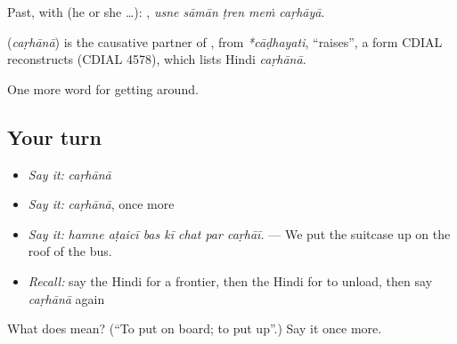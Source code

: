 Past, with  (he or she …):     , \emph{usne sāmān ṭren meṁ caṛhāyā}.

\begin{cousinweb}
\textbf{} (\emph{caṛhānā}) is the causative partner of , from \emph{*cāḍhayati}, \textquotedblleft{}raises\textquotedblright{}, a form CDIAL reconstructs (CDIAL 4578), which lists Hindi \emph{caṛhānā}.
\end{cousinweb}

\begin{grammarlens}[title={What you've built}]
One more word for getting around.
\end{grammarlens}

\subsection*{Your turn}
\begin{itemize}
\raggedright
  \item \emph{Say it:} \emph{caṛhānā}
  \item \emph{Say it:} \emph{caṛhānā}, once more
  \item \emph{Say it:} \emph{hamne aṭaicī bas kī chat par caṛhāī.} — We put the suitcase up on the roof of the bus.
  \item \emph{Recall:} say the Hindi for a frontier, then the Hindi for to unload, then say \emph{caṛhānā} again
\end{itemize}

\begin{tcolorbox}[breakable,colback=teal!4,colframe=teal!35!black,title={Before you move on}]
What does  mean? (\textquotedblleft{}To put on board; to put up\textquotedblright{}.) Say it once more.
\end{tcolorbox}
